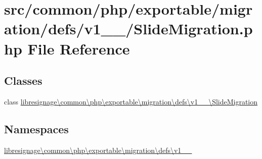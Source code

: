 \hypertarget{v1__0__0_2SlideMigration_8php}{}\section{src/common/php/exportable/migration/defs/v1\+\_\+\_/\+Slide\+Migration.php File Reference}
\label{v1__0__0_2SlideMigration_8php}
\subsection*{Classes}
\begin{DoxyCompactItemize}
\item 
class \hyperlink{classlibresignage_1_1common_1_1php_1_1exportable_1_1migration_1_1defs_1_1v1__0__0_1_1SlideMigration}{libresignage\textbackslash{}common\textbackslash{}php\textbackslash{}exportable\textbackslash{}migration\textbackslash{}defs\textbackslash{}v1\+\_\+\_\textbackslash{}\+Slide\+Migration}
\end{DoxyCompactItemize}
\subsection*{Namespaces}
\begin{DoxyCompactItemize}
\item 
 \hyperlink{namespacelibresignage_1_1common_1_1php_1_1exportable_1_1migration_1_1defs_1_1v1__0__0}{libresignage\textbackslash{}common\textbackslash{}php\textbackslash{}exportable\textbackslash{}migration\textbackslash{}defs\textbackslash{}v1\+\_\+\_}
\end{DoxyCompactItemize}
